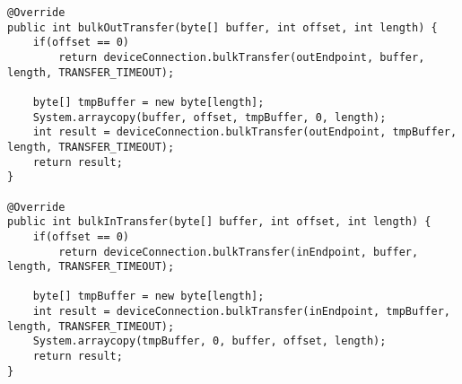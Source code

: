 \begin{lstlisting}[caption=Workaround for the missing method in API level lower 18, label=listing:workaround_api]
@Override
public int bulkOutTransfer(byte[] buffer, int offset, int length) {
	if(offset == 0)
		return deviceConnection.bulkTransfer(outEndpoint, buffer, length, TRANSFER_TIMEOUT);
	
	byte[] tmpBuffer = new byte[length];
	System.arraycopy(buffer, offset, tmpBuffer, 0, length);
	int result = deviceConnection.bulkTransfer(outEndpoint, tmpBuffer, length, TRANSFER_TIMEOUT);
	return result;
}

@Override
public int bulkInTransfer(byte[] buffer, int offset, int length) {
	if(offset == 0)
		return deviceConnection.bulkTransfer(inEndpoint, buffer, length, TRANSFER_TIMEOUT);
	
	byte[] tmpBuffer = new byte[length];
	int result = deviceConnection.bulkTransfer(inEndpoint, tmpBuffer, length, TRANSFER_TIMEOUT);
	System.arraycopy(tmpBuffer, 0, buffer, offset, length);
	return result;
}
\end{lstlisting}